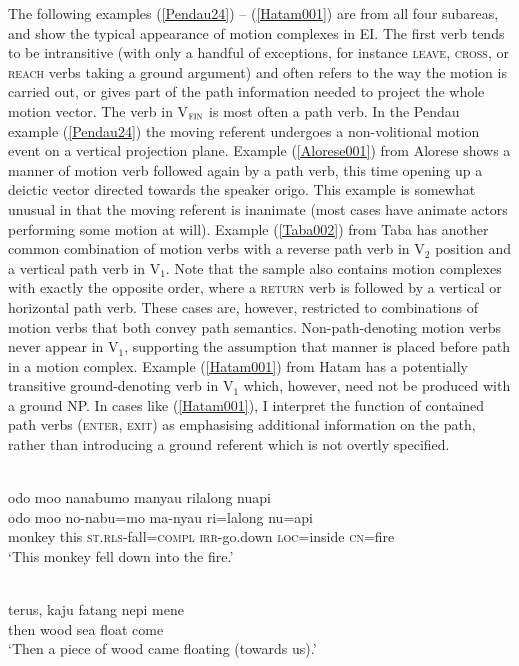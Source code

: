 The following examples (\ref{Pendau24}) -- (\ref{Hatam001}) are from all four subareas, and show the typical appearance of motion complexes in EI. The first verb tends to be intransitive (with only a handful of exceptions, for instance \textsc{leave}, \textsc{cross}, or \textsc{reach} verbs taking a ground argument) and often refers to the way the motion is carried out, or gives part of the path information needed to project the whole motion vector. The verb in V$_{\textsc{fin}}$ is most often a path verb. In the Pendau example (\ref{Pendau24}) the moving referent undergoes a non-volitional motion event on a vertical projection plane. Example (\ref{Alorese001}) from Alorese shows a manner of motion verb followed again by a path verb, this time opening up a deictic vector directed towards the speaker origo. This example is somewhat unusual in that the moving referent is inanimate (most cases have animate actors performing some motion at will). Example (\ref{Taba002}) from Taba has another common combination of motion verbs with a reverse path verb in V$_{2}$ position and a vertical path verb in V$_{1}$. Note that the sample also contains motion complexes with exactly the opposite order, where a \textsc{return} verb is followed by a vertical or horizontal path verb. These cases are, however, restricted to combinations of motion verbs that both convey path semantics. Non-path-denoting motion verbs never appear in V$_1$, supporting the assumption that manner is placed before path in a motion complex. Example (\ref{Hatam001}) from Hatam has a potentially transitive ground-denoting verb in V$_{1}$ which, however, need not be produced with a ground NP. In cases like (\ref{Hatam001}), I interpret the function of contained path verbs (\textsc{enter}, \textsc{exit}) as emphasising additional information on the path, rather than introducing a ground referent which is not overtly specified.

\ea \label{Pendau24}
\\
\glll odo moo nanabumo manyau rilalong nuapi \\
odo moo no-nabu=mo ma-nyau ri=lalong nu=api \\
monkey this \textsc{st}.\textsc{rls}-fall=\textsc{compl} \textsc{irr}-go.down \textsc{loc}=inside \textsc{cn}=fire \\
\glft `This monkey fell down into the fire.' \\ 
\z

\ea \label{Alorese001}
\\
\gll terus, kaju fatang nepi mene \\
then wood sea float come \\
\glft `Then a piece of wood came floating (towards us).'\\ 
\z

